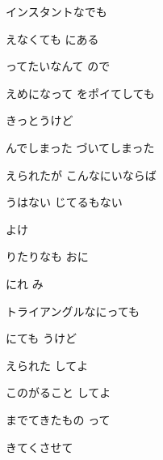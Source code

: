 \documentclass[a4paper,tate,twocolumn,12pt]{ltjtarticle}
\begin{document}
\begin{flushleft}
\begin{minipage}{\linewidth}
インスタントなでも

えなくても にある
\end{minipage}

\vspace{2em}

\noindent\begin{minipage}{\linewidth}
ってたいなんて  ので

えめになって をポイてしても

きっとうけど

んでしまった づいてしまった

えられたが こんなにいならば

うはない じてるもない

よけ
\end{minipage}

\vspace{2em}

\noindent\begin{minipage}{\linewidth}
りたりなも おに

にれ み

トライアングルなにっても

にても うけど
\end{minipage}

\vspace{2em}

\noindent\begin{minipage}{\linewidth}
えられた してよ

このがること してよ

までてきたもの って

きてくさせて
\end{minipage}

\vspace{2em}


\end{flushleft}
\end{document}
